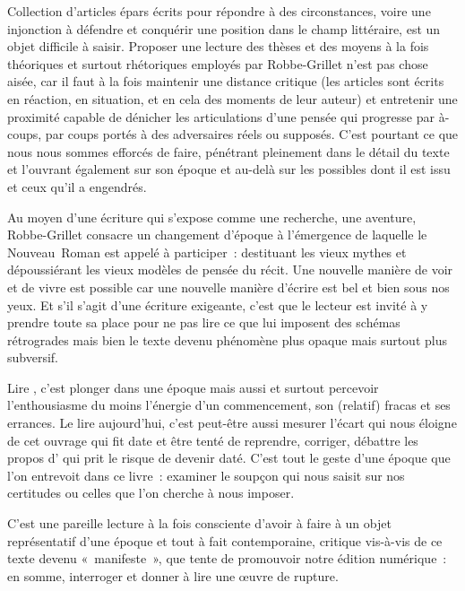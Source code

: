 \newpage

\vspace*{4cm}

Collection d'articles épars écrits pour répondre à des circonstances, voire une injonction à défendre et conquérir une position dans le champ littéraire, \punr{} est un objet difficile à saisir. Proposer une lecture des thèses et des moyens à la fois théoriques et surtout rhétoriques employés par Robbe-Grillet n'est pas chose aisée, car il faut à la fois maintenir une distance critique (les articles sont écrits en réaction, en situation, et en cela des moments de leur auteur) et entretenir une proximité capable de dénicher les articulations d'une pensée qui progresse par à-coups, par coups portés à des adversaires réels ou supposés. C'est pourtant ce que nous nous sommes efforcés de faire, pénétrant pleinement dans le détail du texte et l'ouvrant également sur son époque et au-delà sur les possibles dont il est issu et ceux qu'il a engendrés.

Au moyen d'une écriture qui s'expose comme une recherche, une aventure, Robbe-Grillet consacre un changement d'époque à l'émergence de laquelle le Nouveau~Roman est appelé à participer~: destituant les vieux mythes et dépoussiérant les vieux modèles de pensée du récit. Une nouvelle manière de voir et de vivre est possible car une nouvelle manière d'écrire est bel et bien sous nos yeux. Et s'il s'agit d'une écriture exigeante, c'est que le lecteur est invité à y prendre toute sa place pour ne pas lire ce que lui imposent des schémas rétrogrades mais bien le texte devenu phénomène plus opaque mais surtout plus subversif.

Lire \punr, c'est plonger dans une époque mais aussi et surtout percevoir l'enthousiasme du moins l'énergie d'un commencement, son (relatif) fracas et ses errances. Le lire aujourd'hui, c'est peut-être aussi mesurer l'écart qui nous éloigne de cet ouvrage qui fit date et être tenté de reprendre, corriger, débattre les propos d'\robbe{} qui prit le risque de devenir daté. C'est tout le geste d'une époque que l'on entrevoit dans ce livre~: examiner le soupçon qui nous saisit sur nos certitudes ou celles que l'on cherche à nous imposer.

C'est une pareille lecture à la fois consciente d'avoir à faire à un objet représentatif d'une époque et tout à fait contemporaine, critique vis-à-vis de ce texte devenu «~manifeste~», que tente de promouvoir notre édition numérique~: en somme, interroger et donner à lire une œuvre de rupture.


